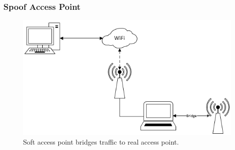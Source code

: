 \subsubsection{Spoof Access Point}
\begin{figure}[h!]
\includegraphics[width=\linewidth]{research/figures/spoofap.png}
\caption{Soft access point bridges traffic to real access point.}
\end{figure}
